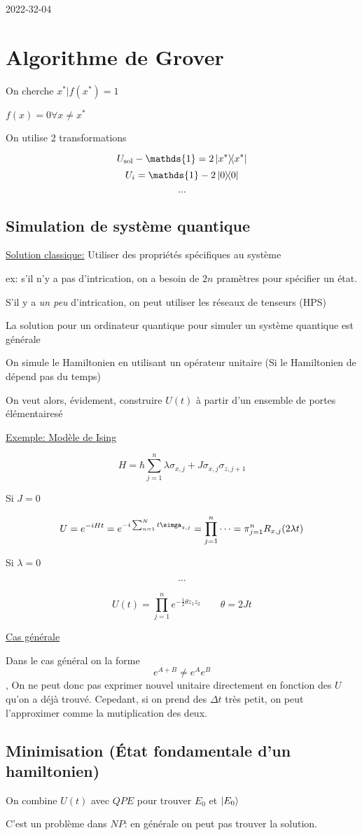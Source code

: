 


2022-32-04

\section*{Algorithme de Grover}

On cherche $x^{*}|f(x^{*})=1$  

$f(x) = 0 \forall x \neq x^{*}$ 

On utilise 2 transformations

$$U_{\text{sol}} - \mathds{1}=2\op{x^{*}} $$ 
$$U_i = \mathds{1} - 2 \op{0}$$ 

$$\dotsb$$ 

\setcounter{section}{2}
\setcounter{subsection}{13}

\subsection{Simulation de système quantique}

\underline{Solution classique:} Utiliser des propriétés spécifiques au système

ex: s'il n'y a pas d'intrication, on a besoin de $2n$ pramètres pour spécifier un état. 

S'il y a \textit{un peu} d'intrication, on peut utiliser les réseaux de tenseurs (HPS)

La solution pour un ordinateur quantique pour simuler un système quantique est générale


On simule le Hamiltonien en utilisant un opérateur unitaire (Si le Hamiltonien de dépend pas du temps)

On veut alors, évidement, construire $U(t)$ à partir d'un ensemble de portes élémentairesé

\underline{Exemple: Modèle de Ising} 

$$H = \hbar \sum_{j=1}^{n} \lambda \sigma_{x,j} + J \sigma_{x,j} \sigma_{z,j+1} $$ 

Si $J= 0$ 

$$U = e^{-i H t} = e^{-i \sum_{n=1}^{N} t \simga_{z,j}} = \prod_{j=1}^{n} \dotsb = \pi_{j=1}^{n}R_{x,j} (2\lambda t) $$ 

Si $\lambda =0 $ 

$$\dotsb$$ 

$$U(t) = \prod_{j=1}^{n} e^{- \frac{1}{2} \theta z_1 z_2 }\qquad \theta = 2 Jt$$ 

\underline{Cas générale } 

Dans le cas général on la forme $$e^{A+B} \neq e^{A}e^{B}$$, On ne peut donc pas exprimer nouvel unitaire directement en fonction des $U$ qu'on a déjà trouvé. Cepedant, si on prend des $\Delta t$ très petit, on peut l'approximer comme la mutiplication des deux.  


\subsection{Minimisation (État fondamentale d'un hamiltonien)}


On combine $U(t)$ avec $QPE$ pour trouver $E_0 $ et $\ket{E_0}$

C'est un problème dans $NP$: en générale on peut pas trouver la solution. 


